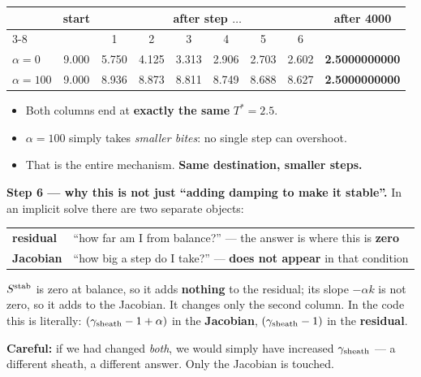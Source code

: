 \documentclass[11pt,a4paper]{article}
\begin{document}
\begin{center}\small
\begin{tabular}{lccccccc c}
\toprule
& start & \multicolumn{6}{c}{after step $\ldots$} & after 4000 \\
\cmidrule(lr){3-8}
& & 1 & 2 & 3 & 4 & 5 & 6 & \\
\midrule
$\alpha=0$   & 9.000 & 5.750 & 4.125 & 3.313 & 2.906 & 2.703 & 2.602 & \textbf{2.5000000000}\\
$\alpha=100$ & 9.000 & 8.936 & 8.873 & 8.811 & 8.749 & 8.688 & 8.627 & \textbf{2.5000000000}\\
\bottomrule
\end{tabular}
\end{center}

\vspace{-2pt}
\begin{itemize}
  \item Both columns end at \textbf{exactly the same} $T^{*}=2.5$.
  \item $\alpha=100$ simply takes \emph{smaller bites}: no single step can overshoot.
  \item That is the entire mechanism. \textbf{Same destination, smaller steps.}
\end{itemize}

\textbf{Step 6 --- why this is not just ``adding damping to make it stable''.} In an implicit
solve there are two separate objects:
\begin{center}\small
\begin{tabular}{ll}
\textbf{residual} & ``how far am I from balance?'' --- the answer is where this is \textbf{zero}\\
\textbf{Jacobian} & ``how big a step do I take?'' --- \textbf{does not appear} in that condition\\
\end{tabular}
\end{center}
$S^{\rm stab}$ is zero at balance, so it adds \textbf{nothing} to the residual; its slope
$-\alpha k$ is not zero, so it adds to the Jacobian. It changes only the second column.
In the code this is literally: \;$(\gamma_{\rm sheath}-1+\alpha)$ in the \textbf{Jacobian},
$(\gamma_{\rm sheath}-1)$ in the \textbf{residual}.

\vspace{2pt}
\textcolor{red!60!black}{\textbf{Careful:}} if we had changed \emph{both}, we would simply have
increased $\gamma_{\rm sheath}$ --- a different sheath, a different answer. Only the Jacobian is
touched.
\end{document}
